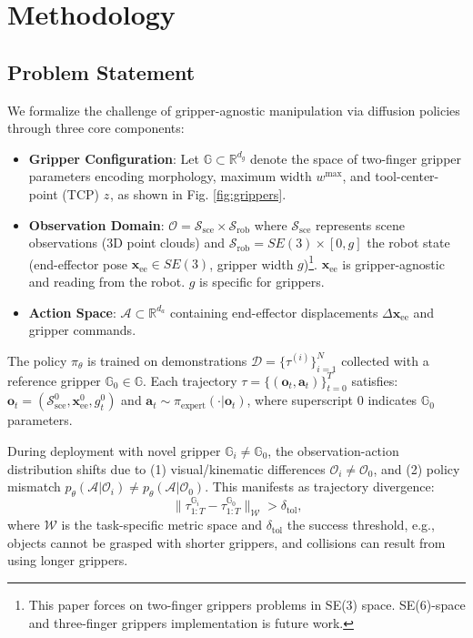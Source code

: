 

\section{Methodology}
\subsection{Problem Statement}

We formalize the challenge of gripper-agnostic manipulation via diffusion policies through three core components:

\begin{itemize}
    \item \textbf{Gripper Configuration}: Let $\mathbb{G} \subset \mathbb{R}^{d_g}$ denote the space of two-finger gripper parameters encoding morphology, maximum width $w^{\max}$, and tool-center-point (TCP) $z^{\text{}}$, as shown in Fig. \ref{fig:grippers}. 
    \item \textbf{Observation Domain}: $\mathcal{O} = \mathcal{S}_{\text{sce}} \times \mathcal{S}_{\text{rob}}$ where $\mathcal{S}_{\text{sce}}$ represents scene observations (3D point clouds) and $\mathcal{S}_{\text{rob}} = SE(3) \times [0,g]$ the robot state (end-effector pose $\mathbf{x}_{\text{ee}} \in SE(3)$, gripper width $g$)\footnote{This paper forces on two-finger grippers problems in SE(3) space. SE(6)-space and three-finger grippers implementation is future work.}. $\mathbf{x}_{\text{ee}}$ is gripper-agnostic and reading from the robot. $g$ is specific for grippers.
    \item \textbf{Action Space}: $\mathcal{A} \subset \mathbb{R}^{d_a}$ containing end-effector displacements $\Delta\mathbf{x}_{\text{ee}}$ and gripper commands. 
\end{itemize}

The policy $\pi_\theta$ is trained on demonstrations $\mathcal{D} = \{\tau^{(i)}\}_{i=1}^N$ collected with a reference gripper $\mathbb{G}_0 \in \mathbb{G}$. Each trajectory $\tau = \{(\mathbf{o}_t, \mathbf{a}_t)\}_{t=0}^T$ satisfies: $\mathbf{o}_t = (\mathcal{S}^0_{\text{sce}}, \mathbf{x}_{\text{ee}}^0, g_t^0)$ and $\mathbf{a}_t \sim \pi_{\text{expert}}(\cdot|\mathbf{o}_t)$,
where superscript $0$ indicates $\mathbb{G}_0$ parameters.

During deployment with novel gripper $\mathbb{G}_i \neq \mathbb{G}_0$, the observation-action distribution shifts due to (1) visual/kinematic differences $\mathcal{O}_i \neq \mathcal{O}_0$, and (2) policy mismatch $p_{\theta}(\mathcal{A}|\mathcal{O}_i) \neq p_{\theta}(\mathcal{A}|\mathcal{O}_0)$. This manifests as trajectory divergence:
\begin{equation}
\|\tau_{1:T}^{\mathbb{G}_i} - \tau_{1:T}^{\mathbb{G}_0}\|_{\mathcal{W}} > \delta_{\text{tol}}\text{,}
\end{equation}
where $\mathcal{W}$ is the task-specific metric space and $\delta_{\text{tol}}$ the success threshold, e.g., objects cannot be grasped with shorter grippers, and collisions can result from using longer grippers.

